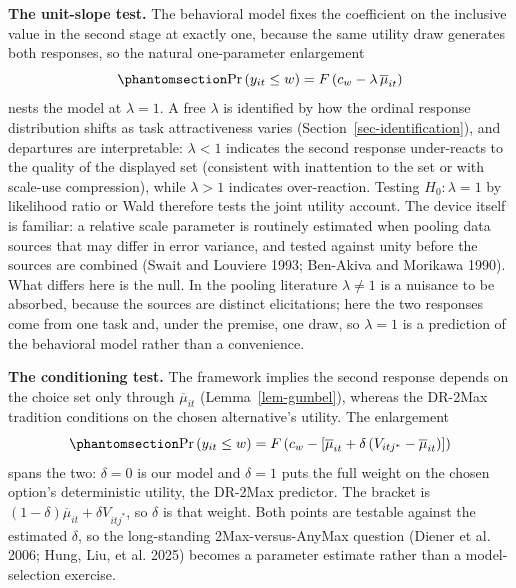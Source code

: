 \documentclass[
  letterpaper,
  DIV=11,
  numbers=noendperiod]{scrartcl}
\theoremstyle{plain}
\theoremstyle{plain}
\theoremstyle{plain}
\theoremstyle{remark}
\begin{document}
\textbf{The unit-slope test.} The behavioral model fixes the coefficient
on the inclusive value in the second stage at exactly one, because the
same utility draw generates both responses, so the natural one-parameter
enlargement \begin{equation}\protect\phantomsection\label{eq-lambda}{
\Pr \left( y_{it} \le w \right) = F \left( c_w - \lambda \, \overline{\mu}_{it} \right)
}\end{equation} nests the model at \(\lambda = 1\). A free \(\lambda\)
is identified by how the ordinal response distribution shifts as task
attractiveness varies (Section~\ref{sec-identification}), and departures
are interpretable: \(\lambda < 1\) indicates the second response
under-reacts to the quality of the displayed set (consistent with
inattention to the set or with scale-use compression), while
\(\lambda > 1\) indicates over-reaction. Testing \(H_0\!: \lambda = 1\)
by likelihood ratio or Wald therefore tests the joint utility account.
The device itself is familiar: a relative scale parameter is routinely
estimated when pooling data sources that may differ in error variance,
and tested against unity before the sources are combined (Swait and
Louviere 1993; Ben-Akiva and Morikawa 1990). What differs here is the
null. In the pooling literature \(\lambda \ne 1\) is a nuisance to be
absorbed, because the sources are distinct elicitations; here the two
responses come from one task and, under the premise, one draw, so
\(\lambda = 1\) is a prediction of the behavioral model rather than a
convenience.

\textbf{The conditioning test.} The framework implies the second
response depends on the choice set only through \(\overline{\mu}_{it}\)
(Lemma~\ref{lem-gumbel}), whereas the DR-2Max tradition conditions on
the chosen alternative's utility. The enlargement
\begin{equation}\protect\phantomsection\label{eq-delta}{
\Pr \left( y_{it} \le w \right) = F \left( c_w - \left[ \overline{\mu}_{it} + \delta \left( V_{itj^*} - \overline{\mu}_{it} \right) \right] \right)
}\end{equation} spans the two: \(\delta = 0\) is our model and
\(\delta = 1\) puts the full weight on the chosen option's deterministic
utility, the DR-2Max predictor. The bracket is
\((1-\delta) \overline{\mu}_{it} + \delta V_{itj^*}\), so \(\delta\) is
that weight. Both points are testable against the estimated \(\delta\),
so the long-standing 2Max-versus-AnyMax question (Diener et al. 2006;
Hung, Liu, et al. 2025) becomes a parameter estimate rather than a
model-selection exercise.
\end{document}
